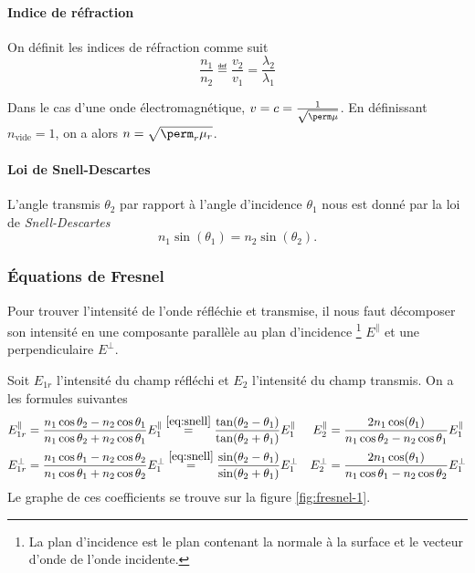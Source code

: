 \paragraph{Indice de réfraction}
On définit les indices de réfraction comme suit
\[ \frac{n_1}{n_2} \eqdef \frac{v_2}{v_1} = \frac{\lambda_2}{\lambda_1} \]

Dans le cas d'une onde électromagnétique,
$v = c = \frac{1}{\sqrt{\perm\mu}}$.
En définissant $n_\mathrm{vide} = 1$,
on a alors
$n = \sqrt{\perm_r\mu_r}$.

\paragraph{Loi de Snell-Descartes}
L'angle transmis $\theta_2$ par rapport à l'angle d'incidence
$\theta_1$ nous est donné par la loi de \emph{Snell-Descartes}
\begin{equation}
  \label{eq:snell}
  n_1 \sin(\theta_1) = n_2 \sin(\theta_2).
\end{equation}

\subsubsection{Équations de Fresnel}
Pour trouver l'intensité de l'onde réfléchie et transmise, il nous
faut décomposer son intensité en une composante parallèle au plan d'incidence
\footnote{La plan d'incidence est le plan contenant la normale à la surface
et le vecteur d'onde de l'onde incidente.}
$E^\parallel$ et une perpendiculaire $E^\perp$.

Soit $E_{1r}$ l'intensité du champ réfléchi
et $E_{2}$ l'intensité du champ transmis.
On a les formules suivantes
\begin{align*}
  E_{1r}^\parallel & = \frac{n_1\cos\theta_2 - n_2\cos\theta_1}
  {n_1\cos\theta_2 + n_2\cos\theta_1}E_{1}^\parallel
  \stackrel{\eqref{eq:snell}}{=}
  \frac{\tan(\theta_2 - \theta_1)}{\tan(\theta_2 + \theta_1)}E_1^\parallel
  & E_2^\parallel & = \frac{2n_1\cos(\theta_1)}
  {n_1\cos\theta_2 - n_2\cos\theta_1}E_{1}^\parallel\\
  E_{1r}^\perp & = \frac{n_1\cos\theta_1 - n_2\cos\theta_2}
  {n_1\cos\theta_1 + n_2\cos\theta_2}E_{1}^\perp
  \stackrel{\eqref{eq:snell}}{=}
  \frac{\sin(\theta_2 - \theta_1)}{\sin(\theta_2 + \theta_1)}E_1^\perp
  & E_2^\perp & = \frac{2n_1\cos(\theta_1)}
  {n_1\cos\theta_1 - n_2\cos\theta_2}E_{1}^\perp\\
\end{align*}
Le graphe de ces coefficients se trouve
sur la figure \ref{fig:fresnel-1}.


